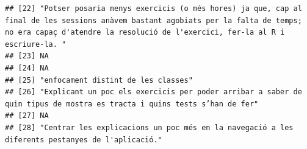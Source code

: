 \documentclass[
]{article}
\begin{document}
\begin{verbatim}
## [22] "Potser posaria menys exercicis (o més hores) ja que, cap al final de les sessions anàvem bastant agobiats per la falta de temps; no era capaç d'atendre la resolució de l'exercici, fer-la al R i escriure-la. "                                                                                                                                                                                    
## [23] NA                                                                                                                                                                                                                                                                                                                                                                                                   
## [24] NA                                                                                                                                                                                                                                                                                                                                                                                                   
## [25] "enfocament distint de les classes"                                                                                                                                                                                                                                                                                                                                                                  
## [26] "Explicant un poc els exercicis per poder arribar a saber de quin tipus de mostra es tracta i quins tests s’han de fer"                                                                                                                                                                                                                                                                              
## [27] NA                                                                                                                                                                                                                                                                                                                                                                                                   
## [28] "Centrar les explicacions un poc més en la navegació a les diferents pestanyes de l'aplicació."                                                                                                                                                                                                                                                                                                      

\end{verbatim}
\end{document}

